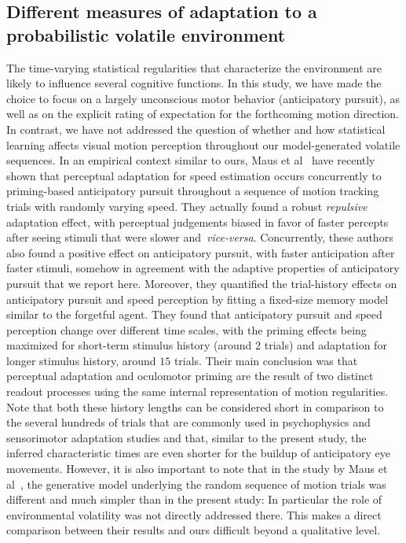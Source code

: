 \documentclass[10pt,letterpaper]{article}
\newcommand{\citet}[1]{\cite{#1}}
\begin{document}
\subsection{Different measures of adaptation to a probabilistic volatile environment}
The time-varying statistical regularities that characterize the environment are likely to influence several cognitive functions. In this study, we have made the choice to focus on a largely unconscious motor behavior (anticipatory pursuit), as well as on the explicit rating of expectation for the forthcoming motion direction. In contrast, we have not addressed the question of whether and how statistical learning affects visual motion perception throughout our model-generated volatile sequences. In an empirical context similar to ours, Maus et al~\citet{Maus2015} have recently shown that perceptual adaptation for speed estimation occurs concurrently to priming-based anticipatory pursuit throughout a sequence of motion tracking trials with randomly varying speed. They actually found a robust \emph{repulsive} adaptation effect, with perceptual judgements biased in favor of faster percepts after seeing stimuli that were slower and~\textit{vice-versa}. Concurrently, these authors also found a positive effect on anticipatory pursuit, with faster anticipation after faster stimuli, somehow in agreement with the adaptive properties of anticipatory pursuit that we report here. Moreover, they quantified the trial-history effects on anticipatory pursuit and speed perception by fitting a fixed-size memory model similar to the forgetful agent. They found that anticipatory pursuit and speed perception change over different time scales, with the priming effects being maximized for short-term stimulus history (around $2$ trials) and adaptation for longer stimulus history, around $15$ trials. Their main conclusion was that perceptual adaptation and oculomotor priming are the result of two distinct readout processes using the same internal representation of motion regularities. Note that both these history lengths can be considered short in comparison to the several hundreds of trials that are commonly used in psychophysics and sensorimotor adaptation studies and that, similar to the present study, the inferred characteristic times are even shorter for the buildup of anticipatory eye movements. However, it is also important to note that in the study by Maus et al~\citet{Maus2015}, the generative model underlying the random sequence of motion trials was different and much simpler than in the present study: In particular the role of environmental volatility was not directly addressed there. This makes a direct comparison between their results and ours difficult beyond a qualitative level.
\end{document}
